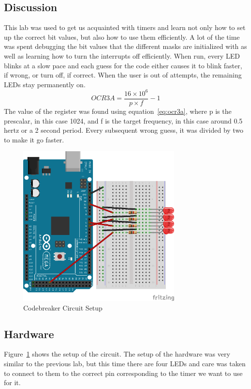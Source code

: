\documentclass[12pt,titlepage]{article}
\begin{document}
\subsection{Discussion}
This lab was used to get us acquainted with timers and learn not only how to set up the correct bit values,
but also how to use them efficiently. A lot of the time was spent debugging the bit values that the different
masks are initialized with as well as learning how to turn the interrupts off efficiently. When run, every
LED blinks at a slow pace and each guess for the code either causes it to blink faster, if wrong, or turn
off, if correct. When the user is out of attempts, the remaining LEDs stay permanently on.
\begin{equation} \label{eq:ocr3a}
  OCR3A = \frac{16\times10^6}{p\times f} - 1
\end{equation}
The value of the register was found using equation~\ref{eq:ocr3a}, where p is the prescalar, in this case
1024, and f is the target frequency, in this case around 0.5 hertz or a 2 second period. Every subsequent
wrong guess, it was divided by two to make it go faster.
\begin{figure}[!htb]
  \centering
  \includegraphics[width=3.25in]{lab_2/schematic.png}
  \caption{Codebreaker Circuit Setup}\label{fig:lab_2}
\end{figure}
\subsection{Hardware}
Figure~\ref{fig:lab_2} shows the setup of the circuit. The setup of the hardware was very similar to
the previous lab, but this time there are four LEDs and care was taken to connect to them to the correct
pin corresponding to the timer we want to use for it.
\newpage
\end{document}
